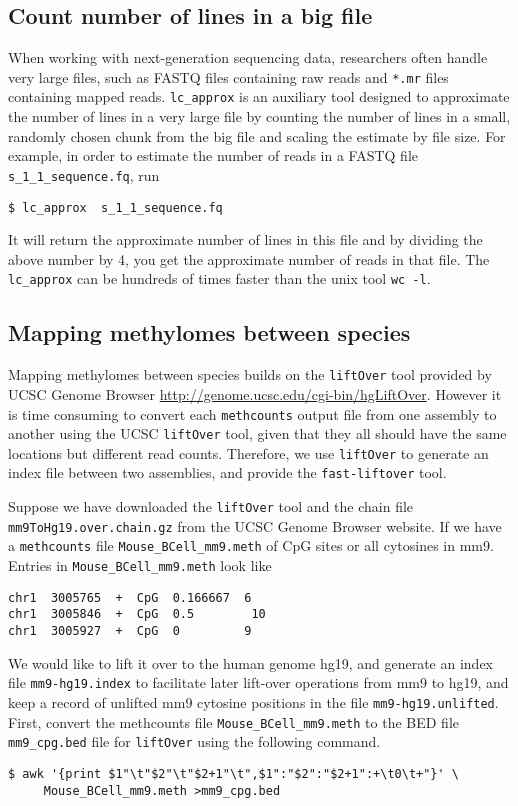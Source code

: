 \documentclass[10pt]{article}
\newcommand{\prog}[1]{\texttt{#1}}
\newcommand{\fn}[1]{\texttt{#1}}
\begin{document}
{{\subsection{Count number of lines in a big file}
\label{sec:count-number-lines}

When working with next-generation sequencing data, researchers often
handle very large files, such as FASTQ files containing raw reads
and \fn{*.mr} files containing mapped reads. \prog{lc\_approx} is
an auxiliary tool designed to approximate the number of lines in a
very large file by counting the number of lines in a small, randomly
chosen chunk from the big file and scaling the estimate by file size.
For example, in order to estimate the number of reads in a FASTQ file
\fn{s\_1\_1\_sequence.fq}, run
\begin{verbatim}
$ lc_approx  s_1_1_sequence.fq
\end{verbatim}
It will return the approximate number of lines in this file and by
dividing the above number by 4, you get the approximate number of
reads in that file. The \prog{lc\_approx} can be hundreds of times
faster than the unix tool \prog{wc -l}.


\subsection{Mapping methylomes between species}
\label{sec:mapp-methyl-betw}
Mapping methylomes between species builds on the \prog{liftOver} tool
provided by UCSC Genome Browser
\url{http://genome.ucsc.edu/cgi-bin/hgLiftOver}. However it is time
consuming to convert each \prog{methcounts} output file from one
assembly to another using the UCSC \prog{liftOver} tool, given that
they all should have the same locations but different read counts.
Therefore, we use \prog{liftOver} to generate an index file between
two assemblies, and provide the \prog{fast-liftover} tool.

Suppose we have downloaded the \prog{liftOver} tool and the chain file
\fn{mm9ToHg19.over.chain.gz} from the UCSC Genome Browser website.  If
we have a \prog{methcounts} file \fn{Mouse\_BCell\_mm9.meth}
of CpG sites or all cytosines in mm9. Entries in
\fn{Mouse\_BCell\_mm9.meth} look like
\begin{verbatim}
chr1  3005765  +  CpG  0.166667  6
chr1  3005846  +  CpG  0.5        10
chr1  3005927  +  CpG  0         9
\end{verbatim}

We would like to lift it over to the human genome hg19, and generate
an index file \fn{mm9-hg19.index} to facilitate later lift-over
operations from mm9 to hg19, and keep a record of unlifted mm9
cytosine positions in the file \fn{mm9-hg19.unlifted}.
First, convert the methcounts file \fn{Mouse\_BCell\_mm9.meth} to the
BED file \fn{mm9\_cpg.bed} file for \prog{liftOver} using the
following command.
\begin{verbatim}
$ awk '{print $1"\t"$2"\t"$2+1"\t",$1":"$2":"$2+1":+\t0\t+"}' \
     Mouse_BCell_mm9.meth >mm9_cpg.bed
\end{verbatim}

}}
\end{document}
